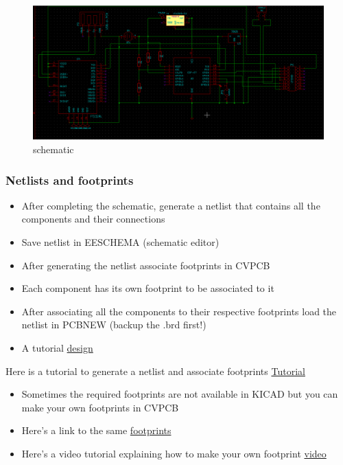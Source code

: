 \documentclass[16pt]{article}
\begin{document}
\begin{figure}

\includegraphics[width=1.2\textwidth]{images/schema.png}
\caption{schematic}
\end{figure}
\vspace{0.4cm}



\subsubsection{Netlists and
footprints}


\begin{itemize}

\item
  After completing the schematic, generate a netlist that contains all
  the components and their connections
\item
  Save netlist in EESCHEMA (schematic editor)
\item
  After generating the netlist associate footprints in CVPCB
\item
  Each component has its own footprint to be associated to it
\item
  After associating all the components to their respective footprints
  load the netlist in PCBNEW (backup the .brd first!)
\item
  A tutorial
 \href{http://store.curiousinventor.com/guides/kicad/schematic_to_layout}{design}
\end{itemize}



Here is a tutorial to generate a netlist and associate footprints
\href{https://www.youtube.com/watch?v=8HNMihqa844}{Tutorial}

\begin{itemize}

\item
  Sometimes the required footprints are not available in KICAD but you
  can make your own footprints in CVPCB
\item
 Here's a link to the same
\href{http://kicadhowto.wikidot.com/mcf1foot1}{footprints}
\item
Here's a video tutorial explaining how to make your own footprint
\href{https://www.youtube.com/watch?v=aVNMJVaRf6M}{video}
\end{itemize}
\end{document}
